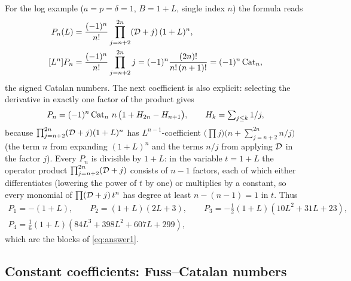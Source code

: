 For the log example ($a=p=\delta=1$, $B=1+L$, single index $n$) the formula reads
\begin{equation}
\begin{aligned}
 P_n(L)&=\frac{(-1)^n}{n!}\prod_{j=n+2}^{2n}(\mathcal D+j)\,(1+L)^n,\\
 [L^n]P_n&=\frac{(-1)^n}{n!}\prod_{j=n+2}^{2n}j=(-1)^n\frac{(2n)!}{n!\,(n+1)!}=(-1)^n\operatorname{Cat}_n,
\end{aligned}
 \label{eq:log-example}
\end{equation}
the signed Catalan numbers. The next coefficient is also explicit: selecting the derivative in exactly one factor of the product gives
\begin{equation}
 [L^{n-1}]P_n=(-1)^n\Cat_n\,n\,\bigl(1+H_{2n}-H_{n+1}\bigr),\qquad H_k=\textstyle\sum_{j\le k}1/j,
 \label{eq:harmonic}
\end{equation}
because $\prod_{j=n+2}^{2n}(\mathcal D+j)(1+L)^n$ has $L^{n-1}$-coefficient $\bigl(\prod j\bigr)\bigl(n+\sum_{j=n+2}^{2n}n/j\bigr)$ (the term $n$ from expanding $(1+L)^n$ and the terms $n/j$ from applying $\mathcal D$ in the factor $j$). Every $P_n$ is divisible by $1+L$: in the variable $t=1+L$ the operator product $\prod_{j=n+2}^{2n}(\mathcal D+j)$ consists of $n-1$ factors, each of which either differentiates (lowering the power of $t$ by one) or multiplies by a constant, so every monomial of $\prod(\mathcal D+j)\,t^n$ has degree at least $n-(n-1)=1$ in $t$. Thus
\begin{gather*}
 P_1=-(1+L),\qquad P_2=(1+L)(2L+3),\qquad P_3=-\tfrac12(1+L)(10L^2+31L+23),\\
 P_4=\tfrac16(1+L)(84L^3+398L^2+607L+299),
\end{gather*}
which are the blocks of \eqref{eq:answer1}.

\subsection{Constant coefficients: Fuss--Catalan numbers}

